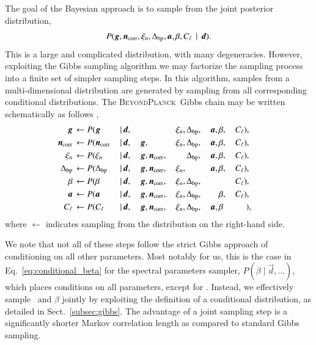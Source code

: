 \documentclass{aa}
\def\,{\thinspace}
\renewcommand{\d}[0]{\vec{d}}
\newcommand{\n}[0]{\vec{n}}
\renewcommand{\a}[0]{\vec{a}}
\newcommand{\g}[0]{\vec{g}}
\newcommand{\Dbp}[0]{\Delta_{\mathrm{bp}}}
\newcommand{\BP}{\textsc{BeyondPlanck}}
\begin{document}
The goal of the Bayesian approach is to sample from the joint posterior distribution,
\begin{equation}
  P(\g,\n_{\mathrm{corr}},\xi_n,\Dbp,\a,\beta,C_{\ell}\,\mid\,\d).
  \label{eq:joint_posterior_full}
\end{equation}
This is a large and complicated distribution, with many degeneracies.
However, exploiting the Gibbs sampling algorithm \citep{geman:1984} we
may factorize the sampling process into a finite set of simpler
sampling steps. In this algorithm, samples from a multi-dimensional
distribution are generated by sampling from all corresponding
conditional distributions. The \BP\ Gibbs chain may
be written schematically as follows \citep{bp01},
\begin{alignat}{10}
\g &\,\leftarrow P(\g&\,\mid &\,\d,&\, & &\,\xi_n, &\,\Dbp, &\,\a, &\,\beta, &\,C_{\ell})\label{eq:conditional_gain},\\
\n_{\mathrm{corr}} &\,\leftarrow P(\n_{\mathrm{corr}}&\,\mid &\,\d, &\,\g, &\,&\,\xi_n,
&\,\Dbp, &\,\a, &\,\beta, &\,C_{\ell}),\\
\xi_n &\,\leftarrow P(\xi_n&\,\mid &\,\d, &\,\g, &\,\n_{\mathrm{corr}}, &\,
&\,\Dbp, &\,\a, &\,\beta, &\,C_{\ell}),\\
\Dbp &\,\leftarrow P(\Dbp&\,\mid &\,\d, &\,\g, &\,\n_{\mathrm{corr}}, &\,\xi_n,
&\,&\,\a, &\,\beta, &\,C_{\ell}),\\
\beta &\,\leftarrow P(\beta&\,\mid &\,\d, &\,\g, &\,\n_{\mathrm{corr}}, &\,\xi_n,
&\,\Dbp, & &\,&\,C_{\ell})\label{eq:conditional_beta},\\
\a &\,\leftarrow P(\a&\,\mid &\,\d, &\,\g, &\,\n_{\mathrm{corr}}, &\,\xi_n,
&\,\Dbp, &\,&\,\beta, &\,C_{\ell})\label{eq:conditional_amp},\\
C_{\ell} &\,\leftarrow P(C_{\ell}&\,\mid &\,\d, &\,\g, &\,\n_{\mathrm{corr}}, &\,\xi_n,
        &\,\Dbp, &\,\a, &\,\beta&\,\phantom{C_{\ell}})&,\label{eq:conditional_bp}
\end{alignat}
where $\leftarrow$ indicates sampling from the distribution on the right-hand side.


We note that not all of these steps follow the strict Gibbs approach
of conditioning on all other parameters. Most notably for us, this is
the case in Eq.~\eqref{eq:conditional_beta} for the spectral
parameters sampler, $P(\beta\mid\d,\ldots)$, which places conditions on all parameters,
except for \a. Instead, we effectively sample \a\ and $\beta$ jointly by
exploiting the definition of a conditional distribution, as detailed
in Sect.~\ref{subsec:gibbs}. The advantage of a joint sampling step is
a significantly shorter Markov correlation length as compared to
standard Gibbs sampling.
\end{document}
